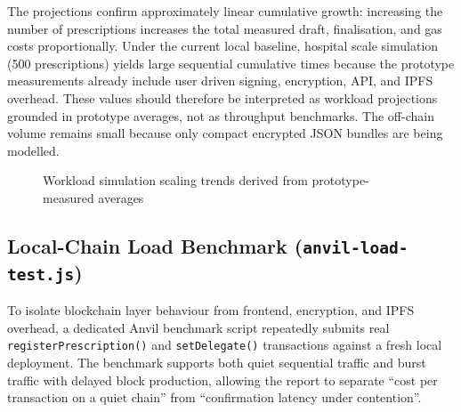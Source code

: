 \documentclass[12pt,a4wide]{report}
\begin{document}
The projections confirm approximately linear cumulative growth: increasing the
number of prescriptions increases the total measured draft, finalisation, and gas
costs proportionally. Under the current local baseline, hospital scale simulation
(500 prescriptions) yields large sequential cumulative times because the prototype
measurements already include user driven signing, encryption, API, and IPFS
overhead. These values should therefore be interpreted as workload projections
grounded in prototype averages, not as throughput benchmarks. The off-chain volume
remains small because only compact encrypted JSON bundles are being modelled.

\begin{figure}[p]
\centering
{}
\caption{Workload simulation scaling trends derived from prototype-measured averages}
\label{fig:workload-plots}
\end{figure}

\subsection{Local-Chain Load Benchmark (\texttt{anvil-load-test.js})}

To isolate blockchain layer behaviour from frontend, encryption, and IPFS overhead,
a dedicated Anvil benchmark script repeatedly submits real \texttt{registerPrescription()}
and \texttt{setDelegate()} transactions against a fresh local deployment. The
benchmark supports both quiet sequential traffic and burst traffic with delayed
block production, allowing the report to separate ``cost per transaction on a
quiet chain'' from ``confirmation latency under contention''.
\end{document}
